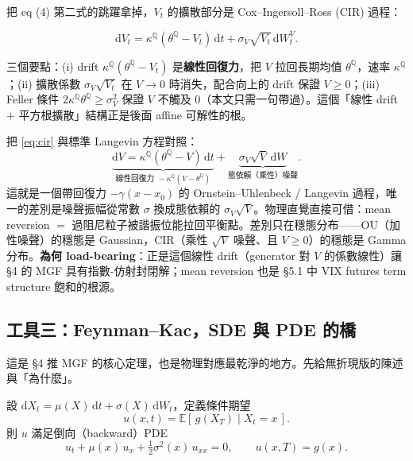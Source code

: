 \documentclass[12pt, a4paper]{article}
\theoremstyle{remark}
\newcommand{\E}{\mathbb{E}}
\newcommand{\Q}{\mathbb{Q}}
\newcommand{\dd}{\mathrm{d}}
\begin{document}
把 eq (4) 第二式的跳躍拿掉，$V_t$ 的擴散部分是 Cox--Ingersoll--Ross (CIR) 過程：

\begin{equation}
  \dd V_t = \kappa^\Q(\theta^\Q-V_t)\,\dd t + \sigma_V\sqrt{V_t}\,\dd W_t^V.
  \tag{$\star$4}\label{eq:cir}
\end{equation}

三個要點：(i) drift $\kappa^\Q(\theta^\Q-V_t)$ 是\textbf{線性回復力}，把 $V$ 拉回長期均值 $\theta^\Q$，速率 $\kappa^\Q$；(ii) 擴散係數 $\sigma_V\sqrt{V_t}$ 在 $V\to 0$ 時消失，配合向上的 drift 保證 $V\ge 0$；(iii) Feller 條件 $2\kappa^\Q\theta^\Q\ge\sigma_V^2$ 保證 $V$ 不觸及 $0$（本文只需一句帶過）。這個「線性 drift $+$ 平方根擴散」結構正是後面 affine 可解性的根。

\begin{physicsbox}[title={CIR $\equiv$ Ornstein--Uhlenbeck / Langevin（乘性噪聲版）}]
把 \eqref{eq:cir} 與標準 Langevin 方程對照：
\[
  \underbrace{\dd V = \kappa^\Q(\theta^\Q-V)\,\dd t}_{\text{線性回復力 }-\kappa^\Q(V-\theta^\Q)}
  + \underbrace{\sigma_V\sqrt{V}\,\dd W}_{\text{態依賴（乘性）噪聲}}.
\]
這就是一個帶回復力 $-\gamma(x-x_0)$ 的 Ornstein--Uhlenbeck / Langevin 過程，唯一的差別是噪聲振幅從常數 $\sigma$ 換成態依賴的 $\sigma_V\sqrt{V}$。物理直覺直接可借：mean reversion $=$ 過阻尼粒子被諧振位能拉回平衡點。差別只在穩態分布——OU（加性噪聲）的穩態是 Gaussian，CIR（乘性 $\sqrt{V}$ 噪聲、且 $V\ge0$）的穩態是 Gamma 分布。\textbf{為何 load-bearing}：正是這個線性 drift（generator 對 $V$ 的係數線性）讓 §4 的 MGF 具有指數-仿射封閉解；mean reversion 也是 §5.1 中 VIX futures term structure 飽和的根源。
\end{physicsbox}

\subsection{工具三：Feynman--Kac，SDE 與 PDE 的橋}

這是 §4 推 MGF 的核心定理，也是物理對應最乾淨的地方。先給無折現版的陳述與「為什麼」。

\begin{keybox}[title={Feynman--Kac（無折現，純擴散版）}]
設 $\dd X_t = \mu(X)\,\dd t + \sigma(X)\,\dd W_t$，定義條件期望
\[
  u(x,t) = \E\!\left[\,g(X_T)\mid X_t = x\,\right].
\]
則 $u$ 滿足倒向（backward）PDE
\begin{equation}
  u_t + \mu(x)\,u_x + \tfrac12\sigma^2(x)\,u_{xx} = 0,\qquad u(x,T)=g(x).
  \tag{$\star$5}\label{eq:fk}
\end{equation}
\end{keybox}
\end{document}
